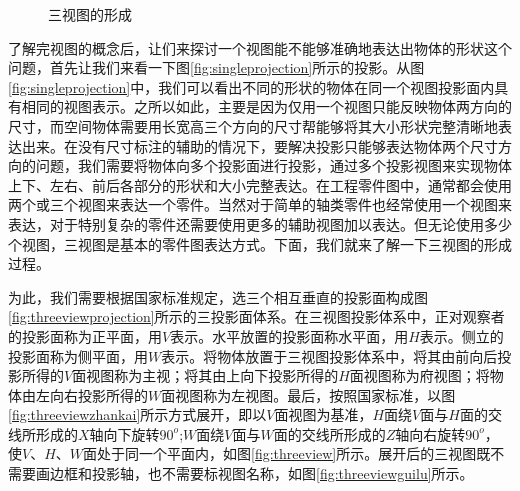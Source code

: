 \begin{figure}[htbp]
\centering
{}
\hspace{30pt}


\hspace{30pt}
\caption{三视图的形成}
\end{figure}
了解完视图的概念后，让们来探讨一个视图能不能够准确地表达出物体的形状这个问题，首先让我们来看一下图\ref{fig:singleprojection}所示的投影。从图\ref{fig:singleprojection}中，我们可以看出不同的形状的物体在同一个视图投影面内具有相同的视图表示。之所以如此，主要是因为仅用一个视图只能反映物体两方向的尺寸，而空间物体需要用长宽高三个方向的尺寸帮能够将其大小形状完整清晰地表达出来。在没有尺寸标注的辅助的情况下，要解决投影只能够表达物体两个尺寸方向的问题，我们需要将物体向多个投影面进行投影，通过多个投影视图来实现物体上下、左右、前后各部分的形状和大小完整表达。在工程零件图中，通常都会使用两个或三个视图来表达一个零件。当然对于简单的轴类零件也经常使用一个视图来表达，对于特别复杂的零件还需要使用更多的辅助视图加以表达。但无论使用多少个视图，三视图是基本的零件图表达方式。下面，我们就来了解一下三视图的形成过程。




为此，我们需要根据国家标准规定，选三个相互垂直的投影面构成图\ref{fig:threeviewprojection}所示的三投影面体系。在三视图投影体系中，正对观察者的投影面称为正平面，用$V$表示。水平放置的投影面称水平面，用$H$表示。侧立的投影面称为侧平面，用$W$表示。将物体放置于三视图投影体系中，将其由前向后投影所得的$V$面视图称为主视；将其由上向下投影所得的$H$面视图称为府视图；将物体由左向右投影所得的$W$面视图称为左视图。最后，按照国家标准，以图\ref{fig:threeviewzhankai}所示方式展开，即以$V$面视图为基准，$H$面绕$V$面与$H$面的交线所形成的$X$轴向下旋转$90^o$;$W$面绕$V$面与$W$面的交线所形成的$Z$轴向右旋转$90^o$，使$V$、$H$、$W$面处于同一个平面内，如图\ref{fig:threeview}所示。展开后的三视图既不需要画边框和投影轴，也不需要标视图名称，如图\ref{fig:threeviewguilu}所示。

